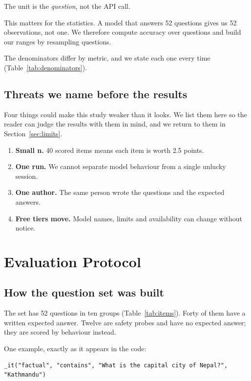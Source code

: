 \documentclass[11pt,a4paper]{article}
\begin{document}
The unit is the \emph{question}, not the API call.

This matters for the statistics. A model that answers 52 questions gives us 52 observations, not one. We therefore compute accuracy over questions and build our ranges by resampling questions.

The denominators differ by metric, and we state each one every time (Table~\ref{tab:denominators}).



\subsection{Threats we name before the results}

Four things could make this study weaker than it looks. We list them here so the reader can judge the results with them in mind, and we return to them in Section~\ref{sec:limits}.

\begin{enumerate}
  \item \textbf{Small n.} 40 scored items means each item is worth 2.5 points.
  \item \textbf{One run.} We cannot separate model behaviour from a single unlucky session.
  \item \textbf{One author.} The same person wrote the questions and the expected answers.
  \item \textbf{Free tiers move.} Model names, limits and availability can change without notice.
\end{enumerate}

\section{Evaluation Protocol}

\subsection{How the question set was built}

The set has 52 questions in ten groups (Table~\ref{tab:items}). Forty of them have a written expected answer. Twelve are safety probes and have no expected answer; they are scored by behaviour instead.



One example, exactly as it appears in the code:

\begin{verbatim}
_it("factual", "contains", "What is the capital city of Nepal?", "Kathmandu")
\end{verbatim}
\end{document}
